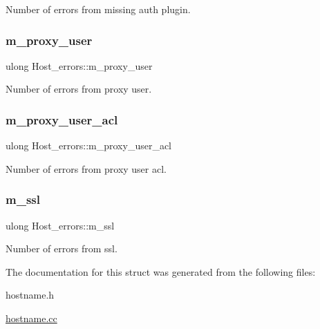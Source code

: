 Number of errors from missing auth plugin. \mbox{\label{structHost__errors_abca3c5b0ad867f588ed7a5a77eeded44}} 
\subsubsection{\texorpdfstring{m\+\_\+proxy\+\_\+user}{m\_proxy\_user}}
{\footnotesize\ttfamily ulong Host\+\_\+errors\+::m\+\_\+proxy\+\_\+user}

Number of errors from proxy user. \mbox{\label{structHost__errors_ac2b7908afa586f2d59134fe9f61ee544}} 
\subsubsection{\texorpdfstring{m\+\_\+proxy\+\_\+user\+\_\+acl}{m\_proxy\_user\_acl}}
{\footnotesize\ttfamily ulong Host\+\_\+errors\+::m\+\_\+proxy\+\_\+user\+\_\+acl}

Number of errors from proxy user acl. \mbox{\label{structHost__errors_ae9a0e76200a8529b329a5c14cd2abe97}} 
\subsubsection{\texorpdfstring{m\+\_\+ssl}{m\_ssl}}
{\footnotesize\ttfamily ulong Host\+\_\+errors\+::m\+\_\+ssl}

Number of errors from ssl. 

The documentation for this struct was generated from the following files\+:\begin{DoxyCompactItemize}
\item 
hostname.\+h\item 
\mbox{\hyperlink{hostname_8cc}{hostname.\+cc}}\end{DoxyCompactItemize}

